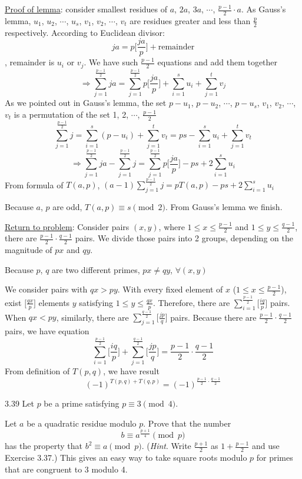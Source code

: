 		\underline{Proof of lemma}: consider smallest residues of $a$, $2a$, $3a$, $\cdots$, $\frac{p-1}{2} \cdot a$. As Gauss's lemma, $u_1$, $u_2$, $\cdots$, $u_s$, $v_1$, $v_2$, $\cdots$, $v_t$ are residues greater and less than $\frac{p}{2}$ respectively. According to Euclidean divisor: $$ja = p \Big[\frac{ja}{p}\Big] + \text{remainder}$$, remainder is $u_i$ or $v_j$. We have such $\frac{p-1}{2}$ equations and add them together $$\Rightarrow \sum_{j=1}^{\frac{p-1}{2}}ja = \sum_{j=1}^{\frac{p-1}{2}}p\Big[\frac{ja}{p}\Big] + \sum_{i=1}^{s}u_i + \sum_{j=1}^{t}v_j$$
		As we pointed out in Gauss's lemma, the set $p-u_1$, $p-u_2$, $\cdots$, $p-u_s$, $v_1$, $v_2$, $\cdots$, $v_t$ is a permutation of the set 1, 2, $\cdots$, $\frac{p-1}{2}$
		$$\sum_{j=1}^{\frac{p-1}{2}}j = \sum_{i=1}^{s}(p-u_i) + \sum_{j=1}^{t}v_t = ps - \sum_{i=1}^{s}u_i + \sum_{j=1}^{t}v_t$$
		$$\Rightarrow \sum_{j=1}^{\frac{p-1}{2}}ja - \sum_{j=1}^{\frac{p-1}{2}}j = \sum_{j=1}^{\frac{p-1}{2}}p\Big[\frac{ja}{p}\Big] - ps + 2\sum_{i=1}^{s}u_i$$
		From formula of $T(a, p)$, $(a-1)\sum_{j=1}^{\frac{p-1}{2}}j = pT(a, p) - ps + 2 \sum_{i=1}^{s}u_i$
		
		Because $a$, $p$ are odd, $T(a, p) \equiv s \pmod 2$. From Gauss's lemma we finish.
		
		\underline{Return to problem}: Consider pairs $(x, y)$, where $1 \leq x \leq \frac{p-1}{2}$ and $1 \leq y \leq \frac{q-1}{2}$, there are $\frac{p-1}{2}\cdot\frac{q-1}{2}$ pairs. We divide those pairs into 2 groups, depending on the magnitude of $px$ and $qy$.
		
		Because $p$, $q$ are two different primes, $px \neq qy$, $\forall (x, y)$
		
		We consider pairs with $qx > py$. With every fixed element of $x$ ($1 \leq x \leq \frac{p-1}{2}$), exist $\Big[\frac{qx}{p}\Big]$ elements $y$ satisfying $1 \leq y \leq \frac{qx}{p}$. Therefore, there are $\sum_{i=1}^{\frac{p-1}{2}}\Big[\frac{iq}{p}\Big]$ pairs. When $qx < py$, similarly, there are $\sum_{j=1}^{\frac{q-1}{2}}\Big[\frac{jp}{q}\Big]$ pairs. Because there are $\frac{p-1}{2} \cdot \frac{q-1}{2}$ pairs, we have equation $$\sum_{i=1}^{\frac{p-1}{2}}\Big[\frac{iq}{p}\Big] + \sum_{j=1}^{\frac{q-1}{2}}\Big[\frac{jp}{q}\Big] = \frac{p-1}{2} \cdot \frac{q-1}{2}$$
		From definition of $T(p, q)$, we have result $$(-1)^{T(p, q) + T(q, p)} = (-1)^{\frac{p-1}{2} \cdot \frac{q-1}{2}}$$
	


3.39 Let $p$ be a prime satisfying $p \equiv 3 \pmod 4$.

		 Let $a$ be a quadratic residue modulo $p$. Prove that the number $$b \equiv a^{\frac{p+1}{4}} \pmod p$$ has the property that $b^2 \equiv a \pmod p$. (\textit{Hint}. Write $\frac{p+1}{2}$ as $1+\frac{p-1}{2}$ and use Exercise 3.37.) This gives an easy way to take square roots modulo $p$ for primes that are congruent to 3 modulo 4.
		
